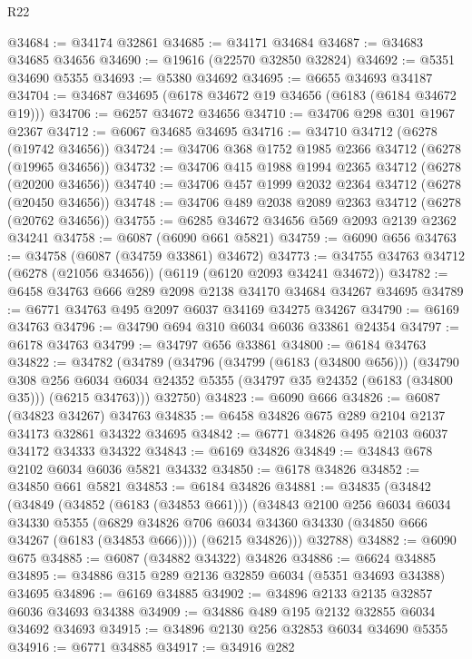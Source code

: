\begin{lexlean}{R22}
\begin{coremodule}
@34684 := @34174 @32861
@34685 := @34171 @34684
@34687 := @34683 @34685 @34656
@34690 := @19616 (@22570 @32850 @32824)
@34692 := @5351 @34690 @5355
@34693 := @5380 @34692
@34695 := @6655 @34693 @34187
@34704 := @34687 @34695 (@6178 @34672 @19 @34656 (@6183 (@6184 @34672 @19)))
@34706 := @6257 @34672 @34656
@34710 := @34706 @298 @301 @1967 @2367
@34712 := @6067 @34685 @34695
@34716 := @34710 @34712 (@6278 (@19742 @34656))
@34724 := @34706 @368 @1752 @1985 @2366 @34712 (@6278 (@19965 @34656))
@34732 := @34706 @415 @1988 @1994 @2365 @34712 (@6278 (@20200 @34656))
@34740 := @34706 @457 @1999 @2032 @2364 @34712 (@6278 (@20450 @34656))
@34748 := @34706 @489 @2038 @2089 @2363 @34712 (@6278 (@20762 @34656))
@34755 := @6285 @34672 @34656 @569 @2093 @2139 @2362 @34241
@34758 := @6087 (@6090 @661 @5821)
@34759 := @6090 @656
@34763 := @34758 (@6087 (@34759 @33861) @34672)
@34773 := @34755 @34763 @34712 (@6278 (@21056 @34656)) (@6119 (@6120 @2093 @34241 @34672))
@34782 := @6458 @34763 @666 @289 @2098 @2138 @34170 @34684 @34267 @34695
@34789 := @6771 @34763 @495 @2097 @6037 @34169 @34275 @34267
@34790 := @6169 @34763
@34796 := @34790 @694 @310 @6034 @6036 @33861 @24354
@34797 := @6178 @34763
@34799 := @34797 @656 @33861
@34800 := @6184 @34763
@34822 := @34782
    (@34789
      (@34796
        (@34799 (@6183 (@34800 @656)))
        (@34790
          @308
          @256
          @6034
          @6034
          @24352
          @5355
          (@34797 @35 @24352 (@6183 (@34800 @35)))
          (@6215 @34763)))
      @32750)
@34823 := @6090 @666
@34826 := @6087 (@34823 @34267) @34763
@34835 := @6458 @34826 @675 @289 @2104 @2137 @34173 @32861 @34322 @34695
@34842 := @6771 @34826 @495 @2103 @6037 @34172 @34333 @34322
@34843 := @6169 @34826
@34849 := @34843 @678 @2102 @6034 @6036 @5821 @34332
@34850 := @6178 @34826
@34852 := @34850 @661 @5821
@34853 := @6184 @34826
@34881 := @34835
    (@34842
      (@34849
        (@34852 (@6183 (@34853 @661)))
        (@34843
          @2100
          @256
          @6034
          @6034
          @34330
          @5355
          (@6829 @34826 @706 @6034 @34360 @34330 (@34850 @666 @34267 (@6183 (@34853 @666))))
          (@6215 @34826)))
      @32788)
@34882 := @6090 @675
@34885 := @6087 (@34882 @34322) @34826
@34886 := @6624 @34885
@34895 := @34886 @315 @289 @2136 @32859 @6034 (@5351 @34693 @34388) @34695
@34896 := @6169 @34885
@34902 := @34896 @2133 @2135 @32857 @6036 @34693 @34388
@34909 := @34886 @489 @195 @2132 @32855 @6034 @34692 @34693
@34915 := @34896 @2130 @256 @32853 @6034 @34690 @5355
@34916 := @6771 @34885
@34917 := @34916 @282

\end{coremodule}
\end{lexlean}

